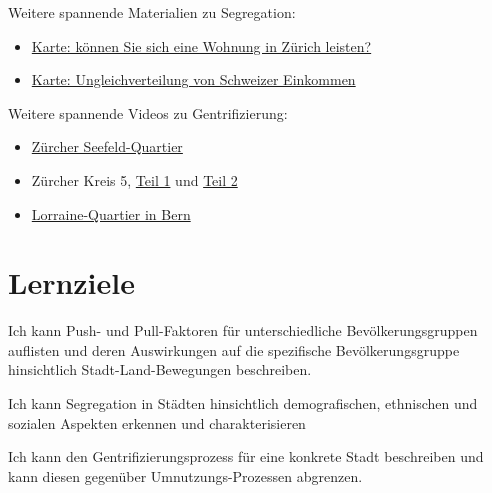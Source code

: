 \begin{mychallenge}
Weitere spannende Materialien zu Segregation:
\begin{itemize}
\item \href{https://www.nzz.ch/visuals/koennen-sie-sich-das-wohnen-in-zuerich-noch-leisten-und-was-ist-mit-ihrer-coiffeuse-diese-grafik-zeigt-es-ihnen-ld.1849030}{Karte: können Sie sich eine Wohnung in Zürich leisten?}
\item \href{https://www.srf.ch/news/schweiz/interaktive-karte-so-ungleich-ist-das-einkommen-in-der-schweiz-verteilt}{Karte: Ungleichverteilung von Schweizer Einkommen}
\end{itemize}
Weitere spannende Videos zu Gentrifizierung:
\begin{itemize}
\item \href{https://www.srf.ch/play/tv/reporter/video/vertrieben-von-zuhause-die-yuppisierung-eines-quartiers?urn=urn:srf:video:910b51ba-aa47-4e4a-99ff-a38aaf8808a6&startTime=121}{Zürcher Seefeld-Quartier}
\item Zürcher Kreis 5, \href{https://www.srf.ch/play/tv/dok/video/die-zuercher-langstrasse-im-wandel---schoene-neue-stadt-12?urn=urn:srf:video:16bd8614-1e7a-4df9-844a-0de361b194ae}{Teil 1} und \href{https://www.srf.ch/play/tv/dok/video/die-zuericher-langstrasse-im-wandel---schoene-neue-stadt-22?urn=urn:srf:video:a7b16698-84f5-4030-ae65-49a8c8f52412}{Teil 2}
\item \href{https://www.srf.ch/play/tv/bericht-vor-8/video/lorraine-quartier-bern?urn=urn:srf:video:0f1c7427-65b7-4ebf-a9ff-c595d08ba1df}{Lorraine-Quartier in Bern}
\end{itemize}
\end{mychallenge}


\newpage
\section{Lernziele}
\begin{todolist}
\item Ich kann Push- und Pull-Faktoren für unterschiedliche Bevölkerungsgruppen auflisten und deren Auswirkungen auf die spezifische Bevölkerungsgruppe hinsichtlich Stadt-Land-Bewegungen beschreiben.
\item Ich kann Segregation in Städten hinsichtlich demografischen, ethnischen und sozialen Aspekten erkennen und charakterisieren
\item Ich kann den Gentrifizierungsprozess für eine konkrete Stadt beschreiben und kann diesen gegenüber Umnutzungs-Prozessen abgrenzen.
\end{todolist}

